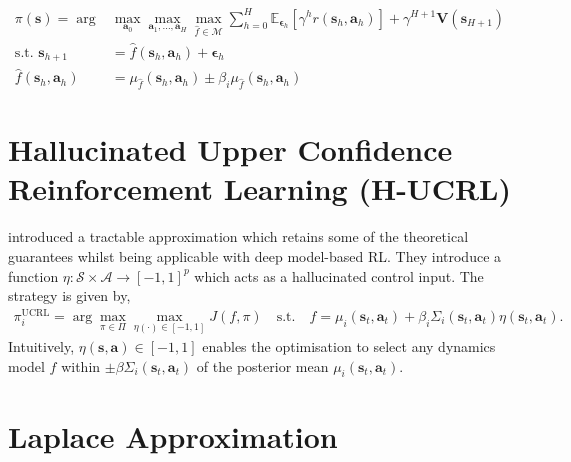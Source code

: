 \documentclass{article}
\newcommand{\state}{\ensuremath{\mathbf{s}}}
\newcommand{\action}{\ensuremath{\mathbf{a}}}
\newcommand{\noise}{\ensuremath{\bm\epsilon}}
\newcommand{\discount}{\ensuremath{\gamma}}
\newcommand{\horizon}{\ensuremath{h}}
\newcommand{\Horizon}{\ensuremath{H}}
\newcommand{\policyDomain}{\ensuremath{\Pi}}
\newcommand{\rewardFn}{\ensuremath{r}}
\newcommand{\transitionFn}{\ensuremath{f}}
\newcommand{\optimisticTransition}{\ensuremath{\hat{f}}}
\newcommand{\optimisticTransitionMean}{\ensuremath{\mu_{\optimisticTransition}}}
\newcommand{\optimisticTransitionCov}{\ensuremath{\mu_{\optimisticTransition}}}
\newcommand{\optimisticTransitionSet}{\ensuremath{\mathcal{M}}}
\newcommand{\stateValueFn}{\ensuremath{\mathbf{V}}}
\newcommand{\policy}{\ensuremath{\pi}}
\begin{document}
\begin{align} \label{}
  \policy(\state) = \arg &\max_{\action_{0}} \max_{\action_{1}, \ldots, \action_{\Horizon}} \max_{\optimisticTransition \in \optimisticTransitionSet}
  \sum_{\horizon=0}^{\Horizon}  \mathbb{E}_{\noise_{\horizon}} \left[  \discount^{\horizon} \rewardFn(\state_{\horizon},\action_{\horizon}) \right] + \discount^{\Horizon+1} \stateValueFn(\state_{\Horizon+1}) \\
  \text{s.t. } \state_{\horizon+1} &= \optimisticTransition(\state_{\horizon}, \action_{\horizon}) + \noise_{\horizon} \\
  \optimisticTransition(\state_{\horizon}, \action_{\horizon}) &=
\optimisticTransitionMean(\state_{\horizon}, \action_{\horizon}) \pm \beta_{i}
\optimisticTransitionCov(\state_{\horizon}, \action_{\horizon})
\end{align}




\section{Hallucinated Upper Confidence Reinforcement Learning (H-UCRL)} \label{sec-hucrl}
\cite{curiEfficient2020} introduced a tractable approximation which retains some of the theoretical guarantees whilst
being applicable with deep model-based RL.
They introduce a function \(\eta: \mathcal{S} \times \mathcal{A} \rightarrow [-1, 1]^{p}\) which acts as a hallucinated control input.
The strategy is given by,
\begin{align} \label{eq-hucrl}
\pi_i^{\text{UCRL}} = \arg \max_{\policy \in \policyDomain} \max_{\eta(\cdot) \in [-1,1]} J(\transitionFn, \policy) \quad \text{s.t.} \quad \transitionFn = \mu_{i}(\state_{t}, \action_{t}) + \beta_{i} \Sigma_{i}(\state_{t}, \action_{t}) \eta(\state_{t},\action_{t}).
\end{align}
Intuitively, \(\eta(\state,\action) \in [-1,1]\) enables the optimisation to select any dynamics model
\(\transitionFn\) within \(\pm \beta \Sigma_{i}(\state_{t}, \action_{t})\) of the posterior mean \(\mu_{i}(\state_{t}, \action_{t})\).

\section{Laplace Approximation} \label{sec-laplace-approximation}
\end{document}
